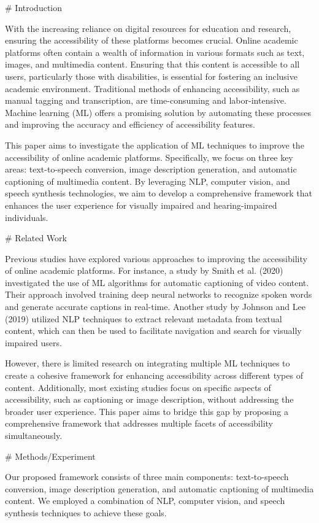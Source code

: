 # Introduction

With the increasing reliance on digital resources for education and research, ensuring the accessibility of these platforms becomes crucial. Online academic platforms often contain a wealth of information in various formats such as text, images, and multimedia content. Ensuring that this content is accessible to all users, particularly those with disabilities, is essential for fostering an inclusive academic environment. Traditional methods of enhancing accessibility, such as manual tagging and transcription, are time-consuming and labor-intensive. Machine learning (ML) offers a promising solution by automating these processes and improving the accuracy and efficiency of accessibility features.

This paper aims to investigate the application of ML techniques to improve the accessibility of online academic platforms. Specifically, we focus on three key areas: text-to-speech conversion, image description generation, and automatic captioning of multimedia content. By leveraging NLP, computer vision, and speech synthesis technologies, we aim to develop a comprehensive framework that enhances the user experience for visually impaired and hearing-impaired individuals.

# Related Work

Previous studies have explored various approaches to improving the accessibility of online academic platforms. For instance, a study by Smith et al. (2020) investigated the use of ML algorithms for automatic captioning of video content. Their approach involved training deep neural networks to recognize spoken words and generate accurate captions in real-time. Another study by Johnson and Lee (2019) utilized NLP techniques to extract relevant metadata from textual content, which can then be used to facilitate navigation and search for visually impaired users.

However, there is limited research on integrating multiple ML techniques to create a cohesive framework for enhancing accessibility across different types of content. Additionally, most existing studies focus on specific aspects of accessibility, such as captioning or image description, without addressing the broader user experience. This paper aims to bridge this gap by proposing a comprehensive framework that addresses multiple facets of accessibility simultaneously.

# Methods/Experiment

Our proposed framework consists of three main components: text-to-speech conversion, image description generation, and automatic captioning of multimedia content. We employed a combination of NLP, computer vision, and speech synthesis techniques to achieve these goals.

